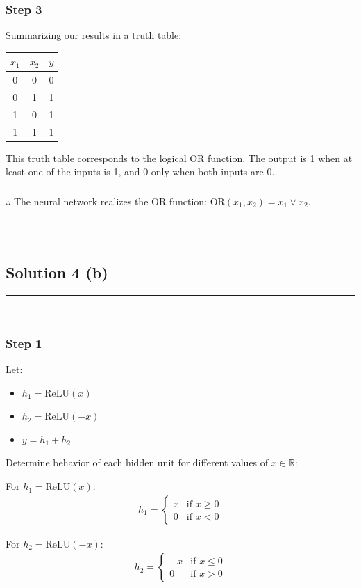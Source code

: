 \documentclass{article}
\begin{document}
\subsubsection*{Step 3}
\parbox{\textwidth}{
Summarizing our results in a truth table:

\begin{center}
\begin{tabular}{|c|c|c|}
\hline
$x_1$ & $x_2$ & $y$ \\
\hline
0 & 0 & 0 \\
0 & 1 & 1 \\
1 & 0 & 1 \\
1 & 1 & 1 \\
\hline
\end{tabular}
\end{center}

This truth table corresponds to the logical OR function. The output is 1 when at least one of the inputs is 1, and 0 only when both inputs are 0.
}

\subsubsection*{\normalfont}{$\therefore$ The neural network realizes the OR function: $\text{OR}(x_1, x_2) = x_1 \vee x_2$.}

\noindent\rule{\textwidth}{0.4pt}\\

\newpage

\subsection*{Solution 4 (b)}
\noindent\rule{\textwidth}{0.4pt}\\

\subsubsection*{Step 1}
\parbox{\textwidth}{
Let:
\begin{itemize}
    \item $h_{1}=\text{ReLU}(x)$
    \item $h_{2}=\text{ReLU}(-x)$
    \item $y=h_{1}+h_{2}$
\end{itemize}

Determine behavior of each hidden unit for different values of $x \in \mathbb{R}$:

For $h_1 = \text{ReLU}(x)$:
\begin{align*}
h_1 = \begin{cases}
x & \text{if } x \geq 0 \\
0 & \text{if } x < 0
\end{cases}
\end{align*}

For $h_2 = \text{ReLU}(-x)$:
\begin{align*}
h_2 = \begin{cases}
-x & \text{if } x \leq 0 \\
0 & \text{if } x > 0
\end{cases}
\end{align*}

}
\end{document}
